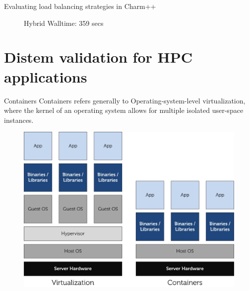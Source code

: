 \documentclass[11pt,xcolor=dvipsnames,presentation]{beamer}
\begin{document}
\begin{frame}[label=sec-3-0-12]{Evaluating load balancing strategies in Charm++}
\begin{minipage}{0.3\textwidth}
\begin{center}
\begin{figure}
    \caption{\centering Hybrid \newline Walltime: 359 secs}
        \label{fig:hybridlbh}
\end{figure}
    \end{center}\end{minipage}
\end{frame}

\section{Distem validation for HPC applications}
\label{sec-4}
\begin{frame}[label=sec-4-0-1]{Containers}
\alert{Containers} refers generally to \alert{Operating-system-level virtualization},
 where the \alert{kernel} of an operating system allows for multiple isolated \alert{user-space instances}.

\begin{figure}[!h]
  \center
  \includegraphics[scale=0.65]{figures/lxc-vm.jpg}
  \label{fig:hpc}
\end{figure}
\end{frame}
\end{document}
